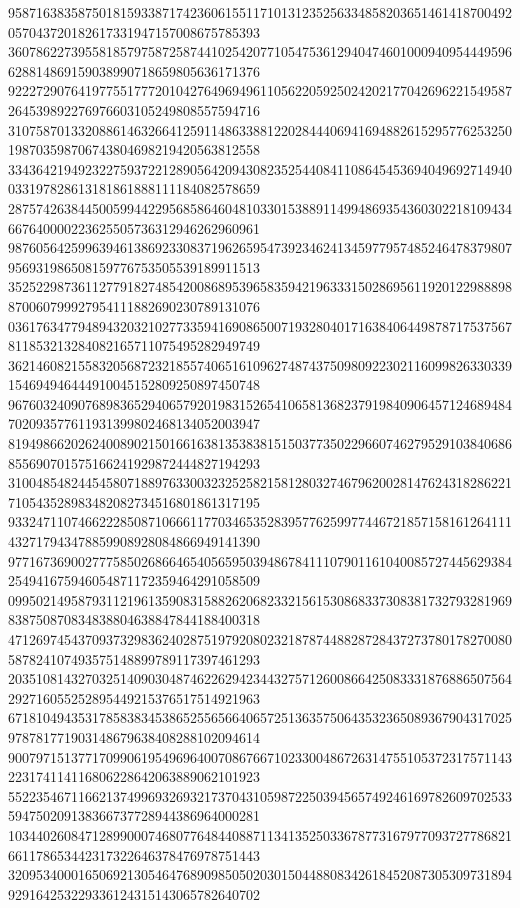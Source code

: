 \begin{DoxyCode}
      958716383587501815933871742360615511710131235256334858203651461418700492057043720182617331947157008675785393
      360786227395581857975872587441025420771054753612940474601000940954449596628814869159038990718659805636171376
      922272907641977551777201042764969496110562205925024202177042696221549587264539892276976603105249808557594716
      310758701332088614632664125911486338812202844406941694882615295776253250198703598706743804698219420563812558
      334364219492322759372212890564209430823525440841108645453694049692714940033197828613181861888111184082578659
      287574263844500599442295685864604810330153889114994869354360302218109434667640000223625505736312946262960961
      987605642599639461386923308371962659547392346241345977957485246478379807956931986508159776753505539189911513
      352522987361127791827485420086895396583594219633315028695611920122988898870060799927954111882690230789131076
      036176347794894320321027733594169086500719328040171638406449878717537567811853213284082165711075495282949749
      362146082155832056872321855740651610962748743750980922302116099826330339154694946444910045152809250897450748
      967603240907689836529406579201983152654106581368237919840906457124689484702093577611931399802468134052003947
      819498662026240089021501661638135383815150377350229660746279529103840686855690701575166241929872444827194293
      310048548244545807188976330032325258215812803274679620028147624318286221710543528983482082734516801861317195
      933247110746622285087106661177034653528395776259977446721857158161264111432717943478859908928084866949141390
      977167369002777585026866465405659503948678411107901161040085727445629384254941675946054871172359464291058509
      099502149587931121961359083158826206823321561530868337308381732793281969838750870834838804638847844188400318
      471269745437093732983624028751979208023218787448828728437273780178270080587824107493575148899789117397461293
      203510814327032514090304874622629423443275712600866425083331876886507564292716055252895449215376517514921963
      671810494353178583834538652556566406572513635750643532365089367904317025978781771903148679638408288102094614
      900797151377170990619549696400708676671023300486726314755105372317571143223174114116806228642063889062101923
      552235467116621374996932693217370431059872250394565749246169782609702533594750209138366737728944386964000281
      103440260847128990007468077648440887113413525033678773167977093727786821661178653442317322646378476978751443
      320953400016506921305464768909850502030150448808342618452087305309731894929164253229336124315143065782640702

\end{DoxyCode}
